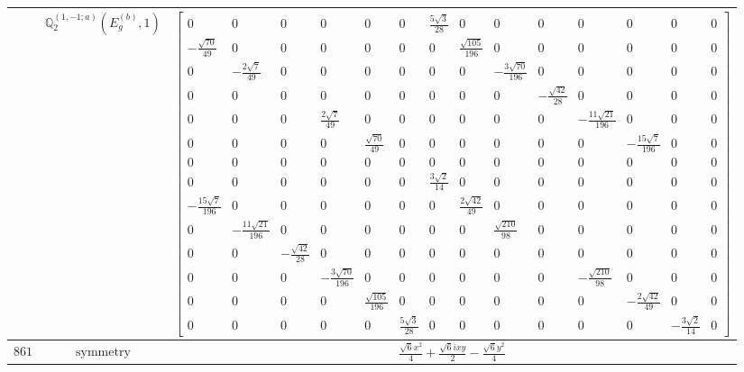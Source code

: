 \documentclass[fleqn,8pt,landscape]{jsarticle}
\begin{document}
\begin{longtable}{ccc}
$  $ & $ \mathbb{Q}_{2}^{(1,-1;a)}(E_{g}^{(b)},1) $ & $ \begin{bmatrix} 0 & 0 & 0 & 0 & 0 & 0 & \frac{5 \sqrt{3}}{28} & 0 & 0 & 0 & 0 & 0 & 0 & 0 \\ - \frac{\sqrt{70}}{49} & 0 & 0 & 0 & 0 & 0 & 0 & \frac{\sqrt{105}}{196} & 0 & 0 & 0 & 0 & 0 & 0 \\ 0 & - \frac{2 \sqrt{7}}{49} & 0 & 0 & 0 & 0 & 0 & 0 & - \frac{3 \sqrt{70}}{196} & 0 & 0 & 0 & 0 & 0 \\ 0 & 0 & 0 & 0 & 0 & 0 & 0 & 0 & 0 & - \frac{\sqrt{42}}{28} & 0 & 0 & 0 & 0 \\ 0 & 0 & 0 & \frac{2 \sqrt{7}}{49} & 0 & 0 & 0 & 0 & 0 & 0 & - \frac{11 \sqrt{21}}{196} & 0 & 0 & 0 \\ 0 & 0 & 0 & 0 & \frac{\sqrt{70}}{49} & 0 & 0 & 0 & 0 & 0 & 0 & - \frac{15 \sqrt{7}}{196} & 0 & 0 \\ 0 & 0 & 0 & 0 & 0 & 0 & 0 & 0 & 0 & 0 & 0 & 0 & 0 & 0 \\ 0 & 0 & 0 & 0 & 0 & 0 & \frac{3 \sqrt{2}}{14} & 0 & 0 & 0 & 0 & 0 & 0 & 0 \\ - \frac{15 \sqrt{7}}{196} & 0 & 0 & 0 & 0 & 0 & 0 & \frac{2 \sqrt{42}}{49} & 0 & 0 & 0 & 0 & 0 & 0 \\ 0 & - \frac{11 \sqrt{21}}{196} & 0 & 0 & 0 & 0 & 0 & 0 & \frac{\sqrt{210}}{98} & 0 & 0 & 0 & 0 & 0 \\ 0 & 0 & - \frac{\sqrt{42}}{28} & 0 & 0 & 0 & 0 & 0 & 0 & 0 & 0 & 0 & 0 & 0 \\ 0 & 0 & 0 & - \frac{3 \sqrt{70}}{196} & 0 & 0 & 0 & 0 & 0 & 0 & - \frac{\sqrt{210}}{98} & 0 & 0 & 0 \\ 0 & 0 & 0 & 0 & \frac{\sqrt{105}}{196} & 0 & 0 & 0 & 0 & 0 & 0 & - \frac{2 \sqrt{42}}{49} & 0 & 0 \\ 0 & 0 & 0 & 0 & 0 & \frac{5 \sqrt{3}}{28} & 0 & 0 & 0 & 0 & 0 & 0 & - \frac{3 \sqrt{2}}{14} & 0 \end{bmatrix} $ \\ \hline
$ 861 $ & $ \text{symmetry} $ & $ \frac{\sqrt{6} x^{2}}{4} + \frac{\sqrt{6} i x y}{2} - \frac{\sqrt{6} y^{2}}{4} $ \\

\end{longtable}
\end{document}
